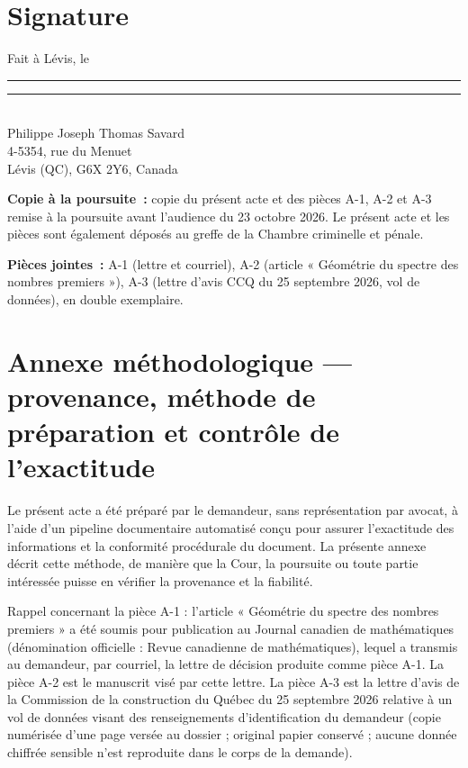 \documentclass[12pt,a4paper]{article}
\begin{document}
\section*{Signature}
\begin{flushright}
\begin{minipage}{0.55\textwidth}
Fait à Lévis, le \rule{3.5cm}{0.4pt}

\vspace{16pt}
\rule{6cm}{0.4pt}\\[4pt]
Philippe Joseph Thomas Savard\\
4-5354, rue du Menuet\\
Lévis (QC), G6X 2Y6, Canada
\end{minipage}
\end{flushright}
\vspace{10pt}

\noindent\textbf{Copie à la poursuite~:} copie du présent acte et des pièces A-1, A-2 et A-3 remise à la poursuite avant l’audience du 23 octobre 2026. Le présent acte et les pièces sont également déposés au greffe de la Chambre criminelle et pénale.


\noindent\textbf{Pièces jointes~:} A-1 (lettre et courriel), A-2 (article « Géométrie du spectre des nombres premiers »), A-3 (lettre d’avis CCQ du 25 septembre 2026, vol de données), en double exemplaire.

\newpage

\section*{Annexe méthodologique — provenance, méthode de préparation et contrôle de l’exactitude}
Le présent acte a été préparé par le demandeur, sans représentation par avocat, à l’aide d’un pipeline documentaire automatisé conçu pour assurer l’exactitude des informations et la conformité procédurale du document. La présente annexe décrit cette méthode, de manière que la Cour, la poursuite ou toute partie intéressée puisse en vérifier la provenance et la fiabilité.

Rappel concernant la pièce A-1 : l’article « Géométrie du spectre des nombres premiers » a été soumis pour publication au Journal canadien de mathématiques (dénomination officielle : Revue canadienne de mathématiques), lequel a transmis au demandeur, par courriel, la lettre de décision produite comme pièce A-1. La pièce A-2 est le manuscrit visé par cette lettre. La pièce A-3 est la lettre d’avis de la Commission de la construction du Québec du 25 septembre 2026 relative à un vol de données visant des renseignements d’identification du demandeur (copie numérisée d’une page versée au dossier ; original papier conservé ; aucune donnée chiffrée sensible n’est reproduite dans le corps de la demande).
\end{document}
